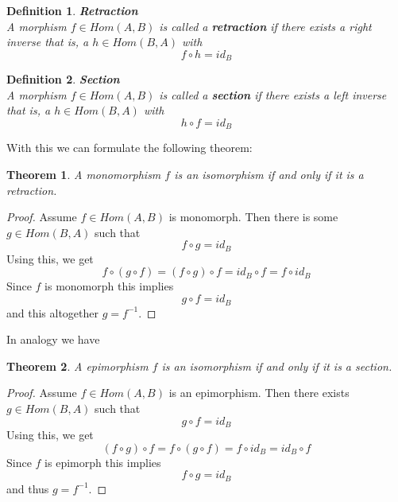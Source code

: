 \documentclass[17pt]{extarticle}
\newtheorem*{definition*}{Definition}
\newtheorem*{theorem*}{Theorem}
\begin{document}
\begin{definition*}
	\textbf{Retraction}\\
	A morphism $f\in Hom(A,B)$ is called a \textbf{retraction} if there exists a right inverse that is,
	a $h\in Hom(B,A)$ with
	$$f\circ h=id_B$$
\end{definition*}

\begin{definition*}
	\textbf{Section}\\
	A morphism $f\in Hom(A,B)$ is called a \textbf{section} if there exists a left inverse that is,
	a $h\in Hom(B,A)$ with
	$$h\circ f=id_B$$
\end{definition*}
\leavevmode\newline
With this we can formulate the following theorem:
\begin{theorem*}
	A monomorphism $f$ is an isomorphism if and only if it is a retraction.
\end{theorem*}
\begin{proof}
	Assume $f\in Hom(A,B)$ is monomorph. Then there is some $g\in Hom(B,A)$ such that 
	$$f\circ g=id_B$$
	Using this, we get
	$$f\circ(g\circ f)=(f\circ g)\circ f=id_B\circ f=f\circ id_B$$
	Since $f$ is monomorph this implies
	$$g\circ f=id_B$$
	and this altogether $g=f^{-1}$.
\end{proof}
\leavevmode\newline
In analogy we have
\begin{theorem*}
	A epimorphism $f$ is an isomorphism if and only if it is a section.
\end{theorem*}
\begin{proof}
	Assume $f\in Hom(A,B)$ is an epimorphism. Then there exists $g\in Hom(B,A)$ such that 
	$$g\circ f=id_B$$
	Using this, we get
	$$(f\circ g)\circ f =f\circ(g\circ f)=f\circ id_B=id_B\circ f$$
	Since $f$ is epimorph this implies
	$$f\circ g=id_B$$
	and thus $g=f^{-1}$.
\end{proof}
\end{document}
